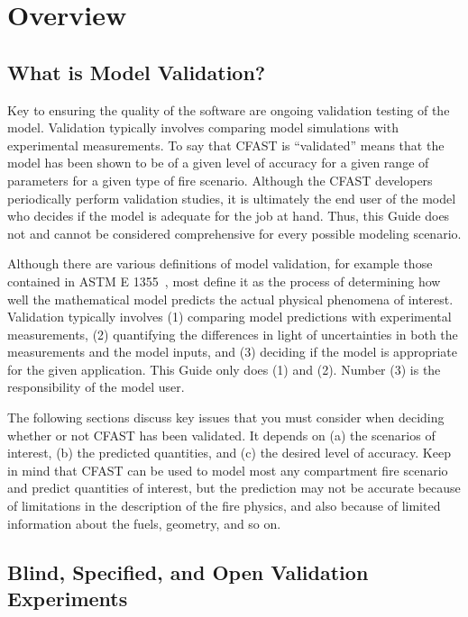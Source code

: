 
\chapter{Overview}



\section{What is Model Validation?}

Key to ensuring the quality of the software are ongoing validation testing of the model. Validation typically involves comparing model simulations with experimental measurements. To say that CFAST is ``validated'' means that the model has been shown to be of a given level of accuracy for a given range of parameters for a given type of fire scenario. Although the CFAST developers periodically perform validation studies, it is ultimately the end user of the model who decides if the model is adequate for the job at hand. Thus, this Guide does not and cannot be considered comprehensive for every possible modeling scenario.

Although there are various definitions of model validation, for example those contained in
ASTM E 1355~\cite{ASTM:E1355}, most define it as the process of determining how well the mathematical model
predicts the actual physical phenomena of interest.
Validation typically involves (1) comparing model predictions with experimental measurements, (2) quantifying the differences in light of uncertainties in
both the measurements and the model inputs, and (3) deciding if the model is appropriate for the given application. This Guide only does (1) and (2). Number (3) is
the responsibility of the model user.

The following sections discuss key issues that you must consider when deciding whether or not CFAST has been validated. It depends on (a) the scenarios
of interest, (b) the predicted quantities, and (c) the desired level of accuracy. Keep in mind that CFAST can be used to model most any compartment fire scenario and predict
quantities of interest, but the prediction may not be accurate because of limitations in the description of the fire physics, and also because of limited
information about the fuels, geometry, and so on.


\section{Blind, Specified, and Open Validation Experiments}

